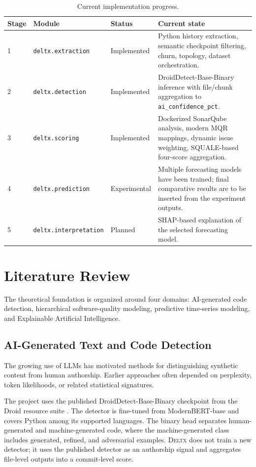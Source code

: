 \documentclass[12pt,a4paper,oneside]{report}
\newcommand{\systemname}{\textsc{Deltx}}
\newcommand{\code}[1]{\nolinkurl{#1}}
\begin{document}
\begin{table}[H]
\centering
\caption{Current implementation progress.}
\label{tab:progress}
\begin{tabularx}{\textwidth}{p{}p{}p{}Y}
\toprule
\textbf{Stage} & \textbf{Module} & \textbf{Status} & \textbf{Current state} \\
 & \code{deltx.extraction} & Implemented & Python history extraction, semantic checkpoint filtering, churn, topology, dataset orchestration. \\
2 & \code{deltx.detection} & Implemented & DroidDetect-Base-Binary inference with file/chunk aggregation to \code{ai\_confidence\_pct}. \\
3 & \code{deltx.scoring} & Implemented & Dockerized SonarQube analysis, modern MQR mappings, dynamic issue weighting, SQUALE-based four-score aggregation. \\
4 & \code{deltx.prediction} & Experimental & Multiple forecasting models have been trained; final comparative results are to be inserted from the experiment outputs. \\
5 & \code{deltx.interpretation} & Planned & SHAP-based explanation of the selected forecasting model. \\
\bottomrule
\end{tabularx}
\end{table}

\chapter{Literature Review}
\label{ch:literature}

The theoretical foundation is organized around four domains: AI-generated code detection, hierarchical software-quality modeling, predictive time-series modeling, and Explainable Artificial Intelligence.

\section{AI-Generated Text and Code Detection}
The growing use of LLMs has motivated methods for distinguishing synthetic content from human authorship. Earlier approaches often depended on perplexity, token likelihoods, or related statistical signatures.

The project uses the published DroidDetect-Base-Binary checkpoint from the Droid resource suite \citep{orel2025droid}. The detector is fine-tuned from ModernBERT-base and covers Python among its supported languages. The binary head separates human-generated and machine-generated code, where the machine-generated class includes generated, refined, and adversarial examples. \systemname{} does not train a new detector; it uses the published detector as an authorship signal and aggregates file-level outputs into a commit-level score.
\end{document}
